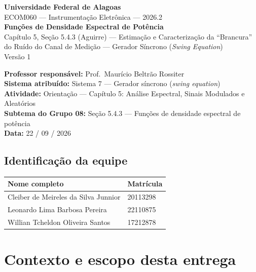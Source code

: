 
\begin{center}
{\large\bfseries Universidade Federal de Alagoas}\\[2pt]
{ECOM060 --- Instrumentação Eletrônica --- 2026.2}\\[10pt]
{\LARGE\bfseries Funções de Densidade Espectral de Potência}\\[4pt]
{\large Capítulo 5, Seção 5.4.3 (Aguirre) --- Estimação e Caracterização da
``Brancura'' do Ruído do Canal de Medição --- Gerador Síncrono (\emph{Swing Equation})}\\[6pt]
{\normalsize Versão 1}
\end{center}

\vspace{4pt}
\noindent\textbf{Professor responsável:} Prof.\ Maurício Beltrão Rossiter\\
\textbf{Sistema atribuído:} Sistema 7 --- Gerador síncrono (\emph{swing equation})\\
\textbf{Atividade:} Orientação --- Capítulo 5: Análise Espectral, Sinais Modulados e Aleatórios\\
\textbf{Subtema do Grupo 08:} Seção 5.4.3 --- Funções de densidade espectral de potência\\
\textbf{Data:} 22 / 09 / 2026

\subsection*{Identificação da equipe}
\begin{center}
\begin{tabular}{ll}
\toprule
\textbf{Nome completo} & \textbf{Matrícula}\\
\midrule
Cleiber de Meireles da Silva Junnior & 20113298\\
Leonardo Lima Barbosa Pereira & 22110875\\
Willian Tcheldon Oliveira Santos & 17212878\\
\bottomrule
\end{tabular}
\end{center}

\section{Contexto e escopo desta entrega}
\label{sec:contexto}

